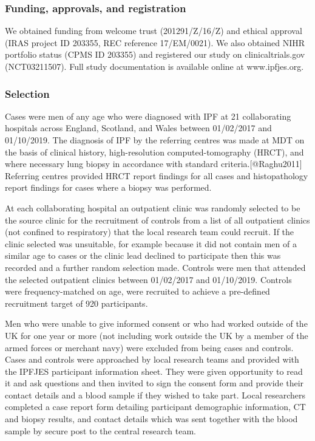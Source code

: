 \documentclass[
]{article}
\begin{document}
\hypertarget{funding-approvals-and-registration}{%
\subsubsection{Funding, approvals, and
registration}\label{funding-approvals-and-registration}}

We obtained funding from welcome trust (201291/Z/16/Z) and ethical
approval (IRAS project ID 203355, REC reference 17/EM/0021). We also
obtained NIHR portfolio status (CPMS ID 203355) and registered our study
on clinicaltrials.gov (NCT03211507). Full study documentation is
available online at www.ipfjes.org.

\hypertarget{selection}{%
\subsubsection{Selection}\label{selection}}

Cases were men of any age who were diagnosed with IPF at 21
collaborating hospitals across England, Scotland, and Wales between
01/02/2017 and 01/10/2019. The diagnosis of IPF by the referring centres
was made at MDT on the basis of clinical history, high-resolution
computed-tomography (HRCT), and where necessary lung biopsy in
accordance with standard criteria.{[}@Raghu2011{]} Referring centres
provided HRCT report findings for all cases and histopathology report
findings for cases where a biopsy was performed.

At each collaborating hospital an outpatient clinic was randomly
selected to be the source clinic for the recruitment of controls from a
list of all outpatient clinics (not confined to respiratory) that the
local research team could recruit. If the clinic selected was
unsuitable, for example because it did not contain men of a similar age
to cases or the clinic lead declined to participate then this was
recorded and a further random selection made. Controls were men that
attended the selected outpatient clinics between 01/02/2017 and
01/10/2019. Controls were frequency-matched on age, were recruited to
achieve a pre-defined recruitment target of 920 participants.

Men who were unable to give informed consent or who had worked outside
of the UK for one year or more (not including work outside the UK by a
member of the armed forces or merchant navy) were excluded from being
cases and controls. Cases and controls were approached by local research
teams and provided with the IPFJES participant information sheet. They
were given opportunity to read it and ask questions and then invited to
sign the consent form and provide their contact details and a blood
sample if they wished to take part. Local researchers completed a case
report form detailing participant demographic information, CT and biopsy
results, and contact details which was sent together with the blood
sample by secure post to the central research team.
\end{document}

